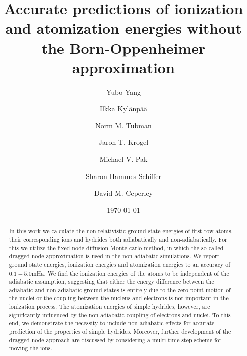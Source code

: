 \documentclass[pra,superscriptaddress,groupedaddress,twocolumn]{revtex4}
\begin{document}
\title{Accurate predictions of ionization and atomization energies without the Born-Oppenheimer approximation}
\author{Yubo Yang}
\author{Ilkka Kyl\"{a}np\"{a}\"{a}}
\author{Norm M. Tubman}
\author{Jaron T. Krogel}
\author{Michael V. Pak}
\author{Sharon Hammes-Schiffer}
\author{David M. Ceperley}
\date{\today}


\begin{abstract}
In this work we calculate the non-relativistic ground-state energies of first row atoms, their corresponding ions and hydrides both adiabatically and non-adiabatically. For this we utilize the fixed-node diffusion Monte carlo method, in which the so-called dragged-node approximation is used in the non-adiabatic simulations. We report ground state energies, ionization energies and atomization energies to an accuracy of $0.1-5.0$mHa. We find the ionization energies of the atoms to be independent of the adiabatic assumption, suggesting that either the energy difference between the adiabatic and non-adiabatic ground states is entirely due to the zero point motion of the nuclei or the coupling between the nucleus and electrons is not important in the ionization process. The atomization energies of simple hydrides, however, are significantly influenced by the non-adiabatic coupling of electrons and nuclei. To this end, we demonstrate the necessity to include non-adiabatic effects for accurate prediction of the properties of simple hydrides. Moreover, further development of the dragged-node approach are discussed by considering a multi-time-step scheme for moving the ions. 
\end{abstract}

\maketitle
\end{document}
